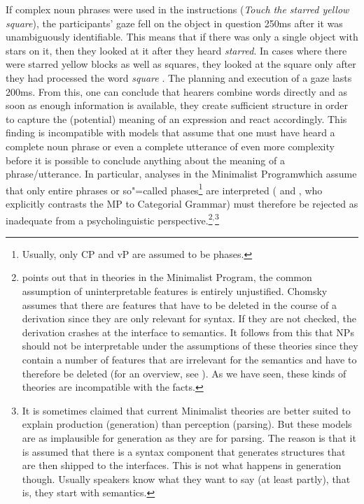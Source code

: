 If complex noun phrases were used in the instructions (\emph{Touch the starred yellow
  square}), the participants' gaze fell on the object in question 250ms after it was unambiguously identifiable.
  This means that if there was only a single object with stars on it, then they looked at it after they heard
  \emph{starred}. In cases where there were starred yellow blocks as well as squares, they looked at the square
  only after they had processed the word \emph{square} \citep[]{TSKES95a}.
The planning and execution of a gaze lasts 200ms. From this, one can conclude that hearers combine words directly
and as soon as enough information is available, they create sufficient structure in order to capture
the (potential) meaning of an expression and react accordingly.
This finding is incompatible with models that assume that one must have heard a complete noun phrase or even a complete utterance
of even more complexity before it is possible to conclude anything about the meaning of a phrase/utterance. 
In particular, analyses in the Minimalist Program\indexmp which assume that only entire phrases or so"=called phases\footnote{
     Usually, only CP and vP are assumed to be phases.
}
are interpreted ( and , who explicitly contrasts the
MP to Categorial Grammar\indexcg) must therefore be rejected as inadequate from a psycholinguistic perspective.\footnote{
\citet[--730]{Sternefeld2006a-u} points out that in theories in the Minimalist Program, the common assumption of uninterpretable
features is entirely unjustified. Chomsky assumes that there are features that have to be deleted in the course of a derivation
since they are only relevant for syntax. If they are not checked, the derivation crashes at the interface to semantics.
It follows from this that NPs should not be interpretable under the assumptions of these theories since they contain a number of features
that are irrelevant for the semantics and have to therefore be deleted (for an overview, see \citealp{Richards2010a}).
As we have seen, these kinds of theories are incompatible with the facts.
}$^,$\footnote{
  It is sometimes claimed that current Minimalist theories are better suited to explain production (generation)
  than perception (parsing). But these models are as implausible for generation as they are for parsing. The
  reason is that it is assumed that there is a syntax component that generates structures that are
  then shipped to the interfaces. This is not what happens in generation though. Usually speakers
  know what they want to say (at least partly), that is, they start with semantics.
}

